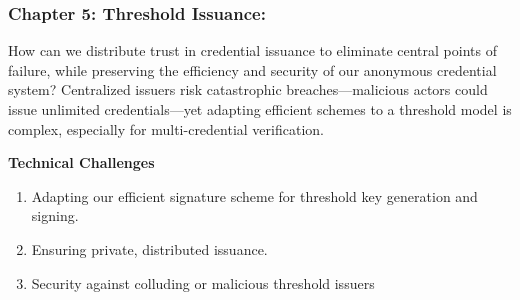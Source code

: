 \subsubsection*{Chapter 5: Threshold Issuance: } 



How can we distribute trust in credential issuance to eliminate central points of failure, while preserving the efficiency and security of our anonymous credential system? Centralized issuers risk catastrophic breaches—malicious actors could issue unlimited credentials—yet adapting efficient schemes to a threshold model is complex, especially for multi-credential verification.

\noindent \textbf{Technical Challenges}
\begin{enumerate}
    \item Adapting our efficient signature scheme for threshold key generation and signing.
    \item Ensuring private, distributed issuance.
    \item Security against colluding or malicious threshold issuers
\end{enumerate}

